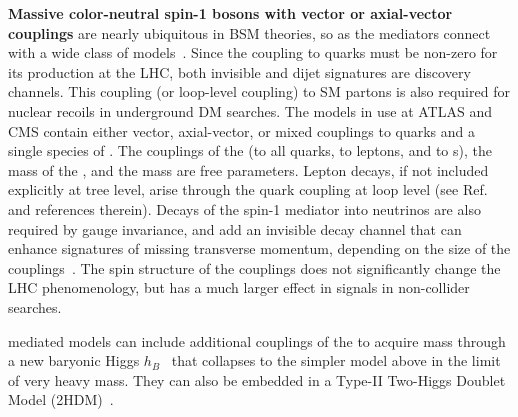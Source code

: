 \textbf{Massive color-neutral spin-1 bosons with vector or axial-vector couplings} are nearly ubiquitous in BSM theories, so \Zprime as the mediators connect with a wide class of models~\cite{Shoemaker:2011vi}.
Since the \Zprime coupling to quarks must be non-zero for its production at the LHC, both invisible and dijet signatures are discovery channels.
This coupling (or loop-level coupling) to SM partons is also required for nuclear recoils in underground DM searches.
The models in use at ATLAS and CMS contain either vector, axial-vector, or mixed couplings to quarks and a single species of {\IP}.
The couplings of the \Zprime (\gq to all quarks, \gl to leptons, and \gDM to {\IP}s), the mass of the {\IP} \mdm, and the \Zprime mass \mmed are free parameters.
Lepton decays, if not included explicitly at tree level, arise through the quark coupling at loop level (see Ref.~\cite{Albert:2017onk} and references therein). Decays of the spin-1 mediator into neutrinos are also required by gauge invariance, and add an invisible decay channel that can enhance signatures of missing transverse momentum, depending on the size of the couplings~\cite{Albert:2017onk}. 
The spin structure of the \Zprime couplings does not significantly change the LHC phenomenology, but has a much larger effect in signals in non-collider searches. 


\Zprime mediated models can include additional couplings of the \Zprime to acquire mass through a new baryonic Higgs $h_B$~\cite{Berlin:2014cfa} that collapses to the simpler model above in the limit of very heavy \Zprime mass. 
They can also be embedded in a Type-II Two-Higgs Doublet Model (2HDM)~\cite{Berlin:2014cfa}.%

